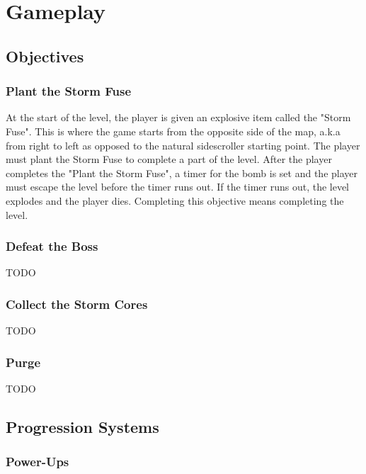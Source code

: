 \documentclass[12pt]{article}
\begin{document}
\section{Gameplay}

\subsection{Objectives}

\subsubsection{Plant the Storm Fuse}

At the start of the level, the player is given an explosive item called the "Storm Fuse". This is where the game starts from the  opposite side of the map, a.k.a from right to left as opposed to the natural sidescroller starting point. The player must plant the Storm Fuse to complete a part of the level. After the player completes the "Plant the Storm Fuse", a timer for the bomb is set and the player must escape the level before the timer runs out. If the timer runs out, the level explodes and the player dies. Completing this objective means completing the level. 

\subsubsection{Defeat the Boss}

TODO

\subsubsection{Collect the Storm Cores}

TODO

\subsubsection{Purge}

TODO

\subsection{Progression Systems}

\subsubsection{Power-Ups}
\end{document}
